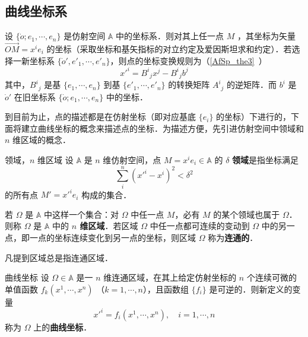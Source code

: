 
\begin{issues}
\issueDraft
\end{issues}

\subsection{曲线坐标系}
设 $\{\dot o;e_1,\cdots,e_n\}$ 是仿射空间 $\mathbb A$ 中的坐标系．则对其上任一点 $M$ ，其坐标为矢量 $\overrightarrow{OM}=x^i e_i$ 的坐标（采取坐标和基矢指标的对立约定及爱因斯坦求和约定）．若选择一新坐标系 $\{\dot o',e'_1,\cdots,e'_n\}$，则点的坐标变换规则为（\autoref{AfSp_the3}~）
\begin{equation}
x'^i={B^i}_jx^j-{B^i}_j b^j
\end{equation}
其中，${B^i}_j$ 是基 $\{e_1,\cdots,e_n\}$ 到基 $\{e'_1,\cdots,e'_n\}$ 的转换矩阵 ${A^i}_j$ 的逆矩阵．而 $b^i$ 是 $\dot o'$ 在旧坐标系 $\{\dot o;e_1,\cdots,e_n\}$ 中的坐标．

到目前为止，点的描述都是在仿射坐标（即对应基底 $\{e_i\}$ 的坐标）下进行的，下面将建立曲线坐标的概念来描述点的坐标．为描述方便，先引进仿射空间中领域和 $n$ 维区域的概念．
\begin{definition}{领域，$n$ 维区域}
设 $\mathbb A$ 是 $n$ 维仿射空间，点 $M=x^ie_i\in\mathbb A$ 的 $\delta$ \textbf{领域}是指坐标满足
\begin{equation}
\sum_{i}^n(x'^i-x^i)^2<\delta^2
\end{equation}
的所有点 $M'=x'^i e_i$ 构成的集合．

若 $\Omega$ 是 $\mathbb A$ 中这样一个集合：对 $\Omega$ 中任一点 $M$，必有 $M$ 的某个领域也属于 $\Omega$．则称 $\Omega$ 是 $\mathbb A$ 中的\textbf{ $n$ 维区域}．若区域 $\Omega$ 中任一点都可连续的变动到 $\Omega$ 中的另一点，即一点的坐标连续变化到另一点的坐标，则区域 $\Omega$ 称为\textbf{连通的}．
\end{definition}

凡提到区域总是指连通区域．

\begin{definition}{曲线坐标}
设 $\Omega\in\mathbb A$ 是一 $n$ 维连通区域，在其上给定仿射坐标的 $n$ 个连续可微的单值函数 $f_k(x^1,\cdots,x^n)$ （$k=1,\cdots,n$），且函数组 $\{f_i\}$ 是可逆的．则新定义的变量
\begin{equation}
x'^i=f_i(x^1,\cdots,x^n),\quad i=1,\cdots,n
\end{equation}
称为 $\Omega$ 上的\textbf{曲线坐标}．
\end{definition}

